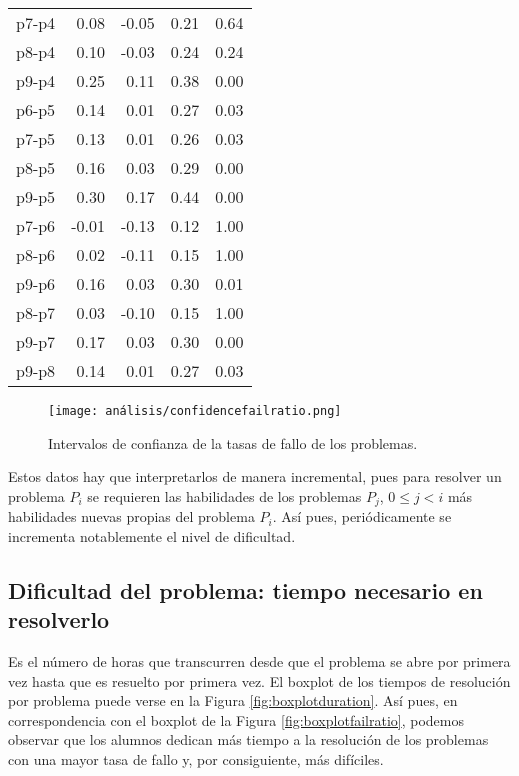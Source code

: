 \begin{table}[H]
\begin{tabular}{rrrrr}
  p7-p4 & 0.08 & -0.05 & 0.21 & 0.64 \\ 
  p8-p4 & 0.10 & -0.03 & 0.24 & 0.24 \\ 
  p9-p4 & 0.25 & 0.11 & 0.38 & 0.00 \\ 
  p6-p5 & 0.14 & 0.01 & 0.27 & 0.03 \\ 
  p7-p5 & 0.13 & 0.01 & 0.26 & 0.03 \\ 
  p8-p5 & 0.16 & 0.03 & 0.29 & 0.00 \\ 
  p9-p5 & 0.30 & 0.17 & 0.44 & 0.00 \\ 
  p7-p6 & -0.01 & -0.13 & 0.12 & 1.00 \\ 
  p8-p6 & 0.02 & -0.11 & 0.15 & 1.00 \\ 
  p9-p6 & 0.16 & 0.03 & 0.30 & 0.01 \\ 
  p8-p7 & 0.03 & -0.10 & 0.15 & 1.00 \\ 
  p9-p7 & 0.17 & 0.03 & 0.30 & 0.00 \\ 
  p9-p8 & 0.14 & 0.01 & 0.27 & 0.03 \\ 
   \hline
\end{tabular}
\end{table}

\begin{figure}[H]
    \centering
    \texttt{[image: análisis/confidencefailratio.png]}
    \caption{Intervalos de confianza de la tasas de fallo de los problemas.}
    \label{fig:confidenceratiofail}
\end{figure}

Estos datos hay que interpretarlos de manera incremental, pues para resolver un problema $P_i$ se requieren las habilidades de los problemas $P_j$, $0\leq j < i$ más habilidades nuevas propias del problema $P_i$. Así pues, periódicamente se incrementa notablemente el nivel de dificultad. %

\subsection{Dificultad del problema: tiempo necesario en resolverlo}

Es el número de horas que transcurren desde que el problema se abre por primera vez hasta que es resuelto por primera vez. El boxplot de los tiempos de resolución por problema puede verse en la Figura \ref{fig:boxplotduration}. Así pues, en correspondencia con el boxplot de la Figura \ref{fig:boxplotfailratio}, podemos observar que los alumnos dedican más tiempo a la resolución de los problemas con una mayor tasa de fallo y, por consiguiente, más difíciles.

